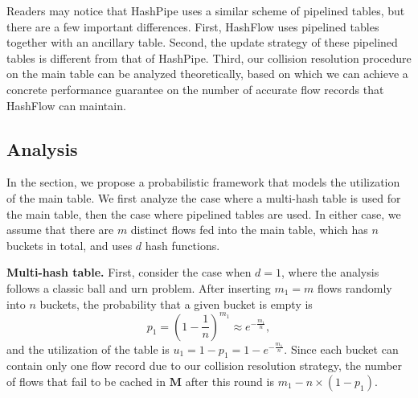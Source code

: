 Readers may notice that HashPipe uses a similar scheme of pipelined tables, 
but there are a few important differences. 
First, HashFlow uses pipelined tables together with an ancillary table.
Second, the update strategy of these pipelined tables is different from that of HashPipe. 
Third,  our collision resolution procedure on the main table can be analyzed theoretically, 
based on which we can achieve a concrete performance guarantee on the number of accurate 
flow records that HashFlow can maintain.

\subsection{Analysis}
\label{analysis}
In the section, we propose a probabilistic framework that models the utilization of the  main table.
We first analyze the case where a multi-hash table is used for the main table,
then the case where pipelined tables are used. 
In either case, we assume that there are $m$ distinct flows fed into the main table, 
which has $n$ buckets in total, and uses $d$ hash functions.



\textbf{Multi-hash table.} First, consider the case when $d=1$, 
where the analysis follows a classic ball and urn problem\cite{urn}.
After inserting $m_1=m$ flows randomly into $n$ buckets, 
the probability that a given bucket is empty is 
\[\label{equation1}
p_1 = (1 - \frac{1}{n})^{m_1} \approx e^{-\frac{m_1}{n}},
\]
and the utilization of the table is 
$u_{1}=1-p_{1}= 1 - e^{-\frac{m_1}{n}}.$
Since each bucket can contain only one flow record due to our collision resolution strategy, 
the number of flows that fail to be cached in $\mathbf{M}$ after this round is $m_1-n\times(1-p_1)$.

